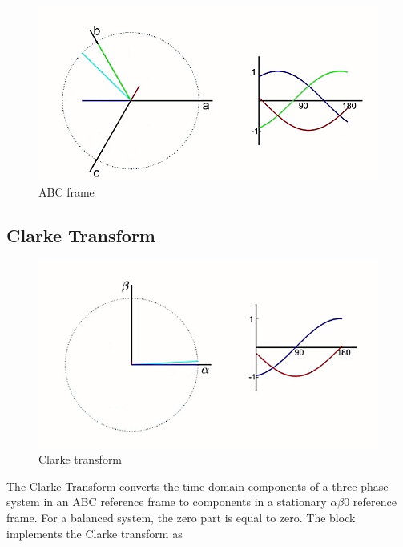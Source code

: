 \documentclass[12pt,a4paper]{book}
\begin{document}
\begin{figure}[h]
  \centering
  \includegraphics[width=12cm]{image16.png}
  \caption{ABC frame}
  \label{fig:image16}
\end{figure}

\subsection{Clarke Transform}

\begin{figure}[h]
  \centering
  \includegraphics[width=12cm]{image17.png}
  \caption{Clarke transform}
  \label{fig:image17}
\end{figure}

The Clarke Transform converts the time-domain components of a three-phase system in an ABC reference frame to components in a stationary \(\alpha\beta\)0 reference frame. For a balanced system, the zero part is equal to zero. The block implements the Clarke transform as
\end{document}
